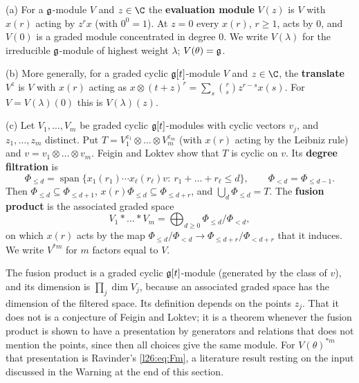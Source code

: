 \begin{definition}\label{l26:def:fusion}
(a) For a $\mathfrak g$-module $V$ and $z\in\C$ the \textbf{evaluation module} $V(z)$ is $V$ with $x(r)$ acting by $z^rx$
(with $0^0=1$). At $z=0$ every $x(r)$, $r\ge1$, acts by $0$, and $V(0)$ is a graded module concentrated in degree $0$.
We write $V(\lambda)$ for the irreducible $\mathfrak g$-module of highest weight $\lambda$; $V(\theta)=\mathfrak g$.

(b) More generally, for a graded cyclic $\mathfrak g[t]$-module $V$ and $z\in\C$, the \textbf{translate} $V^{z}$ is $V$ with
$x(r)$ acting as $x\otimes(t+z)^r=\sum_s\binom rs z^{r-s}x(s)$. For $V=V(\lambda)(0)$ this is $V(\lambda)(z)$.

(c) Let $V_1,\dots,V_m$ be graded cyclic $\mathfrak g[t]$-modules with cyclic vectors $v_j$, and $z_1,\dots,z_m$ distinct.
Put $T=V_1^{z_1}\otimes\dots\otimes V_m^{z_m}$ (with $x(r)$ acting by the Leibniz rule) and $v=v_1\otimes\dots\otimes v_m$.
Feigin and Loktev show that $T$ is cyclic on $v$. Its \textbf{degree filtration} is
\begin{equation*}
\Phi_{\le d}=\operatorname{span}\{x_1(r_1)\cdots x_\ell(r_\ell)v:\ r_1+\dots+r_\ell\le d\},\qquad \Phi_{<d}=\Phi_{\le d-1}.
\end{equation*}
Then $\Phi_{\le d}\subseteq\Phi_{\le d+1}$, $x(r)\Phi_{\le d}\subseteq\Phi_{\le d+r}$, and $\bigcup_d\Phi_{\le d}=T$. The
\textbf{fusion product} is the associated graded space
\begin{equation*}
V_1*\dots*V_m=\bigoplus_{d\ge0}\Phi_{\le d}/\Phi_{<d},
\end{equation*}
on which $x(r)$ acts by the map $\Phi_{\le d}/\Phi_{<d}\to\Phi_{\le d+r}/\Phi_{<d+r}$ that it induces. We write $V^{*m}$ for
$m$ factors equal to $V$.
\end{definition}

The fusion product is a graded cyclic $\mathfrak g[t]$-module (generated by the class of $v$), and its dimension is
$\prod_j\dim V_j$, because an associated graded space has the dimension of the filtered space. Its definition depends on the
points $z_j$. That it does not is a conjecture of Feigin and Loktev; it is a theorem whenever the fusion product is shown to
have a presentation by generators and relations that does not mention the points, since then all choices give the same
module. For $V(\theta)^{*m}$ that presentation is Ravinder's \eqref{l26:eq:Fm}, a literature result resting on the input
discussed in the Warning at the end of this section.

